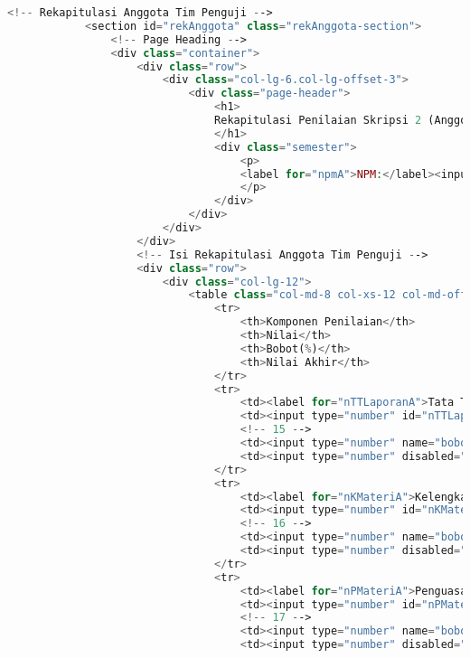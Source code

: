 \begin{lstlisting}[language=PHP,basicstyle=\tiny,caption=skripsi.php]
			<!-- Rekapitulasi Anggota Tim Penguji -->
			<section id="rekAnggota" class="rekAnggota-section">
				<!-- Page Heading -->
				<div class="container">
					<div class="row">
						<div class="col-lg-6.col-lg-offset-3">
							<div class="page-header">
								<h1>
								Rekapitulasi Penilaian Skripsi 2 (Anggota Tim Penguji)
								</h1>
								<div class="semester">
									<p> 
									<label for="npmA">NPM:</label><input id="nmpA" maxlength="10" value="{{ n_npm}}" disabled="disabled" />
									</p>
								</div>
							</div>
						</div>
					</div>
					<!-- Isi Rekapitulasi Anggota Tim Penguji -->
					<div class="row">
						<div class="col-lg-12">
							<table class="col-md-8 col-xs-12 col-md-offset-4 col-md-pull-2 table-responsive">
								<tr>
									<th>Komponen Penilaian</th>
									<th>Nilai</th>
									<th>Bobot(%)</th>
									<th>Nilai Akhir</th>
								</tr>
								<tr>
									<td><label for="nTTLaporanA">Tata Tulis Laporan</label></td>
									<td><input type="number" id="nTTLaporanA" max="100" ng-model="nilai_TTLaporanA" class="form-nilai"/></td>
									<!-- 15 -->
									<td><input type="number" name="bobotTataTulisLaporanAnggota" ng-model="TTLaporanA.value" ng-init="TTLaporanA.value = 15" min="0" max="100" class="form-nilai" readonly="readonly" /></td>
									<td><input type="number" disabled="disabled" value="{{nilai_TTLaporanA * TTLaporanA.value / 100}}" ng-model="total_TTLaporanA" class="form-nilai"/></td>
								</tr>
								<tr>
									<td><label for="nKMateriA">Kelengkapan Materi</label></td>
									<td><input type="number" id="nKMateriA" max="100" ng-model="nilai_KMateriA" class="form-nilai"/></td>
									<!-- 16 -->
									<td><input type="number" name="bobotKelengkapanMateriAnggota" ng-model="KMateriA.value" ng-init="KMateriA.value = 10" min="0" max="100" class="form-nilai" readonly="readonly" /></td>
									<td><input type="number" disabled="disabled" value="{{nilai_KMateriA * KMateriA.value / 100}}" ng-model="total_KMateriA" class="form-nilai"/></td>
								</tr>
								<tr>
									<td><label for="nPMateriA">Penguasaan Materi</label></td>
									<td><input type="number" id="nPMateriA" max="100" ng-model="nilai_PMateriA" class="form-nilai"/></td>
									<!-- 17 -->
									<td><input type="number" name="bobotPenguasaanMateriAnggota" ng-model="PMateriA.value"  ng-init="PMateriA.value = 30" min="0" max="100" class="form-nilai" readonly="readonly" /></td>
									<td><input type="number" disabled="disabled" value="{{nilai_PMateriA * PMateriA.value / 100}}" ng-model="total_PMateriA" class="form-nilai"/></td>

\end{lstlisting}
